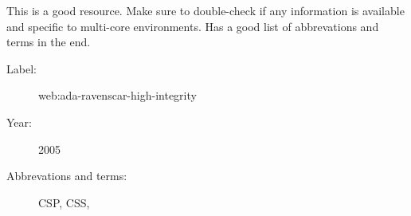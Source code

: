 This is a good resource. Make sure to double-check if any information is
available and specific to multi-core environments. Has a good list of
abbrevations and terms in the end.

\begin{description}
    \item[Label:] web:ada-ravenscar-high-integrity \cite{web:ada-ravenscar-high-integrity}
    \item[Year:] 2005
    \item[Abbrevations and terms:]
        CSP,
        CSS,
\end{description}


